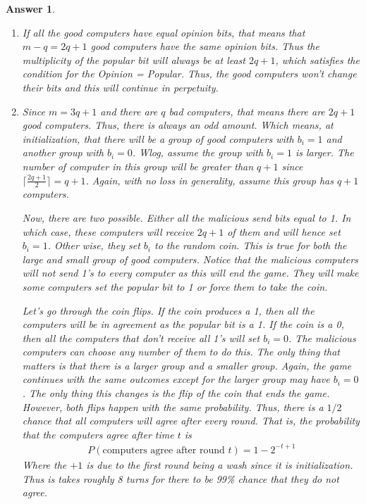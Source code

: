 \documentclass[12pt]{article}
\theoremstyle{colon}
\newtheorem*{answer}{Answer}
\begin{document}
\begin{answer}
  \leavevmode
  \begin{enumerate}[label=\arabic*)]
    \item If all the good computers have equal opinion bits, that means that $m - q = 2q + 1$ good computers have the same opinion bits. Thus the multiplicity of the popular bit will always be at least $2q+1$, which satisfies the condition for the \textit{Opinion} = \textit{Popular}. Thus, the good computers won't change their bits and this will continue in perpetuity.

    \item Since $m = 3q + 1$ and there are $q$ bad computers, that means there are $2q+1$ good computers. Thus, there is always an odd amount. Which means, at initialization, that there will be a group of good computers with $b_i = 1$ and another group with $b_i = 0$. Wlog, assume the group with $b_i = 1$ is larger. The number of computer in this group will be greater than $q+1$ since $\lceil \frac{2q+1}{2} \rceil = q+1$. Again, with no loss in generality, assume this group has $q+1$ computers.

      Now, there are two possible. Either all the malicious send bits equal to 1. In which case, these computers will receive $2q+1$ of them and will hence set $b_i = 1$. Other wise, they set $b_i$ to the random coin. This is true for both the large and small group of good computers. Notice that the malicious computers will not send 1's to every computer as this will end the game. They will make some computers set the popular bit to 1 or force them to take the coin.

      Let's go through the coin flips. If the coin produces a 1, then all the computers will be in agreement as the popular bit is a 1. If the coin is a 0, then all the computers that don't receive all 1's will set $b_i = 0$. The malicious computers can choose any number of them to do this. The only thing that matters is that there is a larger group and a smaller group. Again, the game continues with the same outcomes except for the larger group may have $b_i = 0$. The only thing this changes is the flip of the coin that ends the game. However, both flips happen with the same probability. Thus, there is a $1/2$ chance that all computers will agree after every round. That is, the probability that the computers agree after time $t$ is
      \begin{gather*}
        P(\text{computers agree after round } t) = 1 - 2^{-t+1}
      \end{gather*}
      Where the $+1$ is due to the first round being a wash since it is initialization. Thus is takes roughly 8 turns for there to be 99\% chance that they do not agree.


\end{enumerate}
\end{answer}
\end{document}
